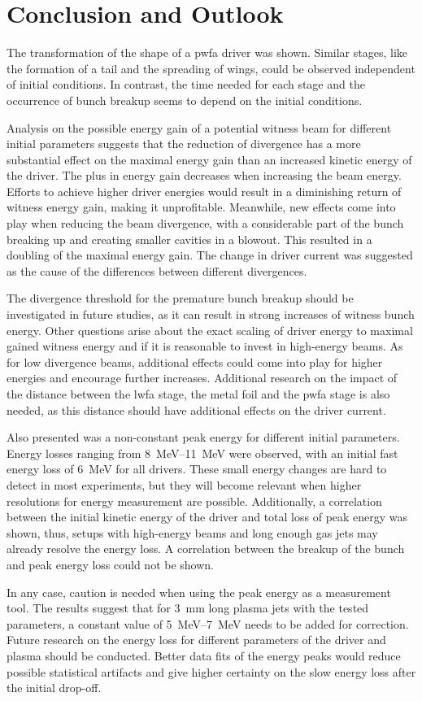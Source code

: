 \documentclass[bachelor_thesis]{subfiles}
\begin{document}
\chapter{Conclusion and Outlook} \label{chap:conclusion}
The transformation of the shape of a \gls{pwfa} driver was shown. Similar stages, like the formation of a tail and the spreading of wings, could be observed independent of initial conditions. 
In contrast, the time needed for each stage and the occurrence of bunch breakup seems to depend on the initial conditions.

Analysis on the possible energy gain of a potential witness beam for different initial parameters suggests that the reduction of divergence has a more substantial effect on the maximal energy gain than an increased kinetic energy of the driver.
The plus in energy gain decreases when increasing the beam energy. Efforts to achieve higher driver energies would result in a diminishing return of witness energy gain, making it unprofitable.
Meanwhile, new effects come into play when reducing the beam divergence, with a considerable part of the bunch breaking up and creating smaller cavities in a blowout. This resulted in a doubling of the maximal energy gain.
The change in driver current was suggested as the cause of the differences between different divergences.

The divergence threshold for the premature bunch breakup should be investigated in future studies, as it can result in strong increases of witness bunch energy.
Other questions arise about the exact scaling of driver energy to maximal gained witness energy and if it is reasonable to invest in high-energy beams. As for low divergence beams, additional effects could come into play for higher energies and encourage further increases.
Additional research on the impact of the distance between the \gls{lwfa} stage, the metal foil and the \gls{pwfa} stage is also needed, as this distance should have additional effects on the driver current.

Also presented was a non-constant peak energy for different initial parameters. Energy losses ranging from \qtyrange{8}{11}{\MeV} were observed, with an initial fast energy loss of \qty{6}{\MeV} for all drivers.
These small energy changes are hard to detect in most experiments, but they will become relevant when higher resolutions for energy measurement are possible. 
Additionally, a correlation between the initial kinetic energy of the driver and total loss of peak energy was shown, thus, setups with high-energy beams and long enough gas jets may already resolve the energy loss.
A correlation between the breakup of the bunch and peak energy loss could not be shown.

In any case, caution is needed when using the peak energy as a measurement tool. The results suggest that for \qty{3}{\mm} long plasma jets with the tested parameters, a constant value of \qtyrange{5}{7}{\MeV} needs to be added for correction.
Future research on the energy loss for different parameters of the driver and plasma should be conducted. Better data fits of the energy peaks would reduce possible statistical artifacts and give higher certainty on the slow energy loss after the initial drop-off.
\end{document}
